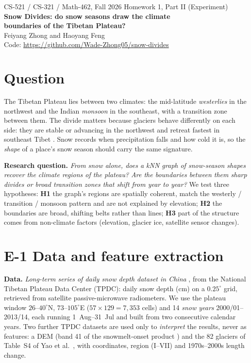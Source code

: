 \documentclass[11pt]{article}
\begin{document}
\begin{center}
  {\small CS-521 / CS-321 / Math-462, Fall 2026 \hfill Homework 1, Part II (Experiment)}\\[0.8em]
  {\Large\bfseries Snow Divides: do snow seasons draw the climate\\[0.2em] boundaries of the Tibetan Plateau?}\\[0.8em]
  Feiyang Zhong \quad and \quad Haoyang Feng\\[0.3em]
  {\small Code: \url{https://github.com/Wade-Zhong05/snow-divides}}
\end{center}

\section*{Question}

The Tibetan Plateau lies between two climates: the mid-latitude \emph{westerlies} in the
northwest and the Indian \emph{monsoon} in the southeast, with a transition zone between
them. The divide matters because glaciers behave differently on each side: they are
stable or advancing in the northwest and retreat fastest in southeast Tibet
\cite{yao2012}. Snow records when precipitation falls and how cold it is, so the
\emph{shape} of a place's snow season should carry the same signature.

\textbf{Research question.} \emph{From snow alone, does a kNN graph of snow-season shapes
recover the climate regions of the plateau? Are the boundaries between them sharp divides
or broad transition zones that shift from year to year?} We test three hypotheses:
\textbf{H1} the graph's regions are spatially coherent, match the westerly / transition /
monsoon pattern and are not explained by elevation; \textbf{H2} the boundaries are broad,
shifting belts rather than lines; \textbf{H3} part of the structure comes from
non-climate factors (elevation, glacier ice, satellite sensor changes).

\section*{E-1 \quad Data and feature extraction}

\textbf{Data.} \emph{Long-term series of daily snow depth dataset in China}
\cite{che_data,che2008,dai2015,dai2017}, from the National Tibetan Plateau Data Center
(TPDC): daily snow depth (cm) on a $0.25^\circ$ grid, retrieved from satellite
passive-microwave radiometers. We use the plateau window $26$--$40^\circ$N,
$73$--$105^\circ$E ($57\times129=7{,}353$ cells) and 14 \emph{snow years} 2000/01--2013/14,
each running 1~Aug--31~Jul and built from two consecutive calendar years. Two further
TPDC datasets are used only to \emph{interpret} the results, never as features: a DEM
(band 41 of the snowmelt-onset product \cite{xiong_data,xiong2017,xiong2019}) and the 82
glaciers of Table~S4 of Yao et al.\ \cite{yao_data,yao2012}, with coordinates, region
(I--VII) and 1970s--2000s length change.
\end{document}
